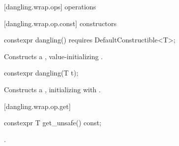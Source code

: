 [dangling.wrap.ops]{ operations}

[dangling.wrap.op.const]{ constructors}

%
\begin{itemdecl}
constexpr dangling() requires DefaultConstructible<T>;
\end{itemdecl}

\begin{itemdescr}
\pnum
\effects Constructs a , value-initializing .
\end{itemdescr}

%
\begin{itemdecl}
constexpr dangling(T t);
\end{itemdecl}

\begin{itemdescr}
\pnum
\effects Constructs a , initializing  with
.
\end{itemdescr}

[dangling.wrap.op.get]{}

%
%
\begin{itemdecl}
constexpr T get_unsafe() const;
\end{itemdecl}

\begin{itemdescr}
\pnum
\returns {}.
\end{itemdescr}

\setcounter{SectionDepthBase}{0}
